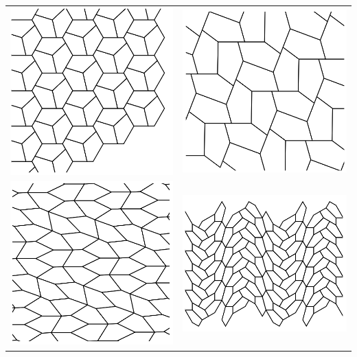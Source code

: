 \documentclass[addpoints,12pt]{exam}
\begin{document}
\begin{tabular}{cc}
\includegraphics[width=.4\textwidth]{T1} & \includegraphics[width=.4\textwidth]{T2} \\
\includegraphics[width=.4\textwidth]{T3} &\includegraphics[width=.4\textwidth]{T15} 
\end{tabular}
\end{document}

